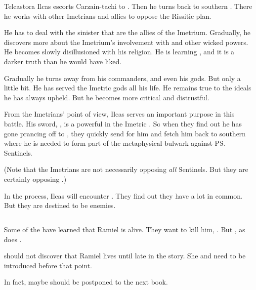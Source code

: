 Telcastora Ilcas escorts Carzain-tachi to \Redce. 
Then he turns back to southern \Velcad. 
There he works with other Imetrians and allies to oppose the Rissitic plan. 

He has to deal with the sinister \nagae{} that are the allies of the Imetrium. 
Gradually, he discovers more about the Imetrium's involvement with \nagae{} and other wicked powers. 
He becomes slowly disillusioned with his religion. 
He is learning , and it is a darker truth than he would have liked. 

Gradually he turns away from his commanders, and even his gods. 
But only a little bit. 
He has served the Imetric gods all his life. 
He remains true to the ideals he has always upheld. 
But he becomes more critical and distrustful. 

From the Imetrians' point of view, Ilcas serves an important purpose in this battle. 
His sword, \Telderain, is a powerful \vertex{} in the Imetric \matrix. 
So when they find out he has gone prancing off to \Redce, they quickly send for him and fetch him back to southern \Velcad{} where he is needed to form part of the metaphysical bulwark against \ps{\Secherdamon} Sentinels. 

(Note that the Imetrians are not necessarily opposing \emph{all} Sentinels. But they are certainly opposing \Secherdamon.) 

In the process, Ilcas will encounter \Narkiza. 
They find out they have a lot in common. 
But they are destined to be enemies. 









\subsection{\Mystraacht}
Some of the \Mystraacht{} have learned that Ramiel is alive. 
They want to kill him, . 
But , as does \Cishiel{}. 

\Cishiel{} should not discover that Ramiel lives until late in the story. 
She and \Dasteron{} need to be introduced before that point. 

In fact, maybe \Cishiel{} should be postponed to the next book. 









